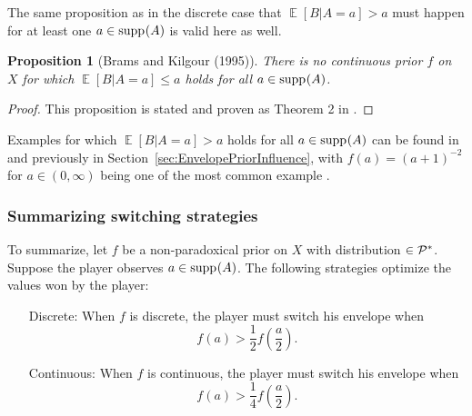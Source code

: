 \documentclass[a4paper]{report}
\theoremstyle{plain}
\newtheorem{proposition}[theorem]{Proposition}
\theoremstyle{definition}
\theoremstyle{remark}
\numberwithin{equation}{chapter}
\let\P\relax
\DeclareMathOperator{\P}{\mathbb{P}}
\DeclareMathOperator{\E}{\mathbb{E}}
\DeclareMathOperator{\1}{\mathbbm{1}}
\DeclareMathOperator{\supp}{supp}
\newcommand{\Pmod}{\mathcal{P}^*}
\begin{document}
The same proposition as in the discrete case that $\E[B|A=a]>a$ must happen for at least one $a\in\supp_{\P}(A)$ is valid here as well.
\begin{proposition}[Brams and Kilgour (1995)]
There is no continuous prior $f$ on $X$ for which $\E[B|A=a]\leq a$ holds for all $a\in\supp_{\P}(A)$.
\end{proposition}
\begin{proof}
This proposition is stated and proven as Theorem 2 in \cite{Brams95}.
\end{proof}

Examples for which $\E[B|A=a]>a$ holds for all $a\in\supp_{\P}(A)$ can be found in \cite{Christensen96,Broome95,Brams95} and previously in Section~\ref{sec:EnvelopePriorInfluence}, with $f(a)=(a+1)^{-2}$ for $a\in(0,\infty)$ being one of the most common example \cite{Broome95}.

\subsubsection{Summarizing switching strategies}
To summarize, let $f$ be a non-paradoxical prior on $X$ with distribution $\P\in\Pmod$. Suppose the player observes $a\in\supp_{\P}(A)$. The following strategies optimize the values won by the player:
\begin{itemize}
\item[Discrete:] When $f$ is discrete, the player must switch his envelope when \begin{equation}
f(a)>\frac{1}{2}f\left(\frac{a}{2}\right).
\end{equation}
\item[Continuous:] When $f$ is continuous, the player must switch his envelope when
\begin{equation}
f(a)>\frac{1}{4}f\left(\frac{a}{2}\right).
\end{equation}
\end{itemize}
\end{document}

